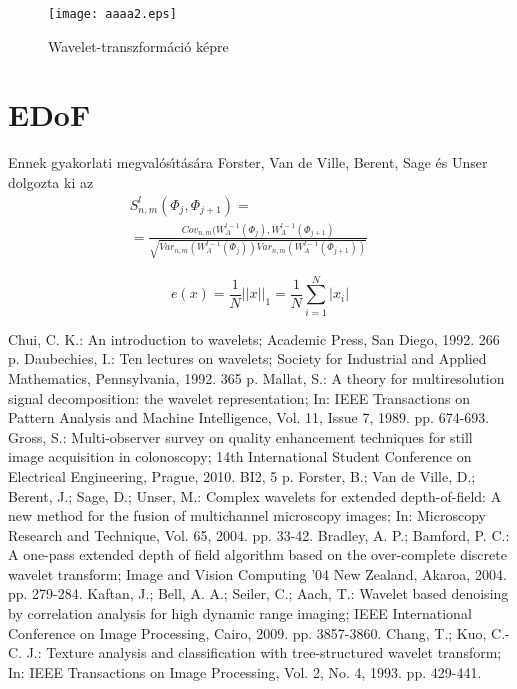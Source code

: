 \documentclass[a4paper, twocolumn]{article}
\begin{document}
\begin{figure}[h!]
\centerline{\texttt{[image: aaaa2.eps]}}
\caption{Wavelet-transzformáció képre}
\label{fig1}
\end{figure}



\section{EDoF}




Ennek gyakorlati megval\'os\'{\i}t\'as\'ara Forster, Van de Ville, Berent, Sage \'es Unser \cite{a4} dolgozta ki az
\begin{eqnarray}
S^l_{n,m}(\Phi_j,\Phi_{j+1}) =& &  \nonumber \\
=\frac{Cov_{n,m}(W^{l-1}_A(\Phi_j),W^{l-1}_A(\Phi_{j+1})} {\sqrt{Var_{n,m}(W^{l-1}_A(\Phi_j))Var_{n,m}(W^{l-1}_A(\Phi_{j+1}))}}&&
\end{eqnarray}



\begin{equation}
e(x) = \frac{1}{N}||x||_1=\frac{1}{N}\sum_{i=1}^{N}|x_i|
\end{equation}

\vspace{-5 mm}

\begin{thebibliography}{1}
 Chui, C. K.: An introduction to wavelets; Academic Press, San Diego, 1992. 266 p.
 Daubechies, I.: Ten lectures on wavelets; Society for Industrial and Applied Mathematics, Pennsylvania, 1992. 365 p.
 Mallat, S.: A theory for multiresolution signal decomposition: the wavelet  representation; In: IEEE Transactions on Pattern Analysis and Machine Intelligence, Vol. 11, Issue 7, 1989. pp. 674-693.
 Gross, S.: Multi-observer survey on quality enhancement techniques
for still image acquisition in colonoscopy; 14th International Student Conference on
Electrical Engineering, Prague, 2010. BI2, 5 p.
 Forster, B.; Van de Ville, D.; Berent, J.; Sage, D.; Unser, M.: Complex wavelets for extended depth-of-field: A new method for the fusion of multichannel microscopy images; In: Microscopy Research and Technique, Vol. 65, 2004. pp. 33-42.
 Bradley, A. P.; Bamford, P. C.: A one-pass extended depth of field algorithm based on the over-complete discrete wavelet transform;  Image and Vision Computing '04 New Zealand, Akaroa, 2004. pp. 279-284.
 Kaftan, J.; Bell, A. A.; Seiler, C.; Aach, T.: Wavelet based denoising by correlation analysis for high dynamic range imaging; IEEE International Conference on Image Processing, Cairo, 2009. pp. 3857-3860.
 Chang, T.; Kuo, C.-C. J.: Texture analysis and classification with tree-structured wavelet transform; In: IEEE Transactions on Image Processing, Vol. 2, No. 4, 1993. pp. 429-441.

\end{thebibliography}

\end{document}
